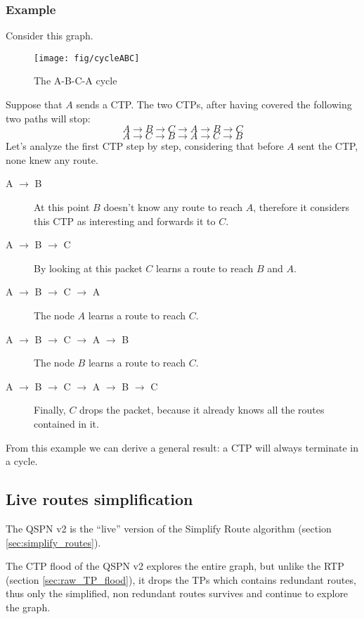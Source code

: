 \documentclass[a4paper]{article}
\begin{document}
\subsubsection*{Example}
\label{sec:cycle_qv2_example}

Consider this graph.
\begin{figure}[h]
	\begin{center}
		\texttt{[image: fig/cycleABC]}
	\end{center}
	\caption{The A-B-C-A cycle}
	\label{fig:A-B-C-A}
\end{figure}
Suppose that $A$ sends a CTP. 
The two CTPs, after having covered the following two paths will stop:
\[
A \rightarrow B \rightarrow C \rightarrow A \rightarrow B \rightarrow C
\]
\[
A \rightarrow C \rightarrow B\rightarrow A \rightarrow C \rightarrow B
\]
Let's analyze the first CTP step by step, considering that before $A$ sent the
CTP, none knew any route.
\begin{description}
	\item[A $\rightarrow$ B] At this point $B$ doesn't know any route to
		reach $A$, therefore it considers this CTP as interesting and
		forwards it to $C$.
	\item[A $\rightarrow$ B $\rightarrow$ C] By looking at this packet $C$
		learns a route to reach $B$ and $A$.
	\item[A $\rightarrow$ B $\rightarrow$ C $\rightarrow$ A] The node $A$
		learns a route to reach $C$.
	\item[A $\rightarrow$ B $\rightarrow$ C $\rightarrow$ A $\rightarrow$
		B] The node $B$ learns a route to reach $C$.
	\item[A $\rightarrow$ B $\rightarrow$ C $\rightarrow$ A $\rightarrow$
		B $\rightarrow$ C] Finally, $C$ drops the packet, because it
		already knows all the routes contained in it.
\end{description}

From this example we can derive a general result: a CTP will always terminate
in a cycle.

\subsection{Live routes simplification}
The QSPN v2 is the ``live'' version of the Simplify Route algorithm (section
\ref{sec:simplify_routes}).

The CTP flood of the QSPN v2 explores the entire graph, but unlike the RTP
(section \ref{sec:raw_TP_flood}), it drops the TPs which contains
redundant routes, thus only the simplified, non redundant routes survives and
continue to explore the graph.
\end{document}

